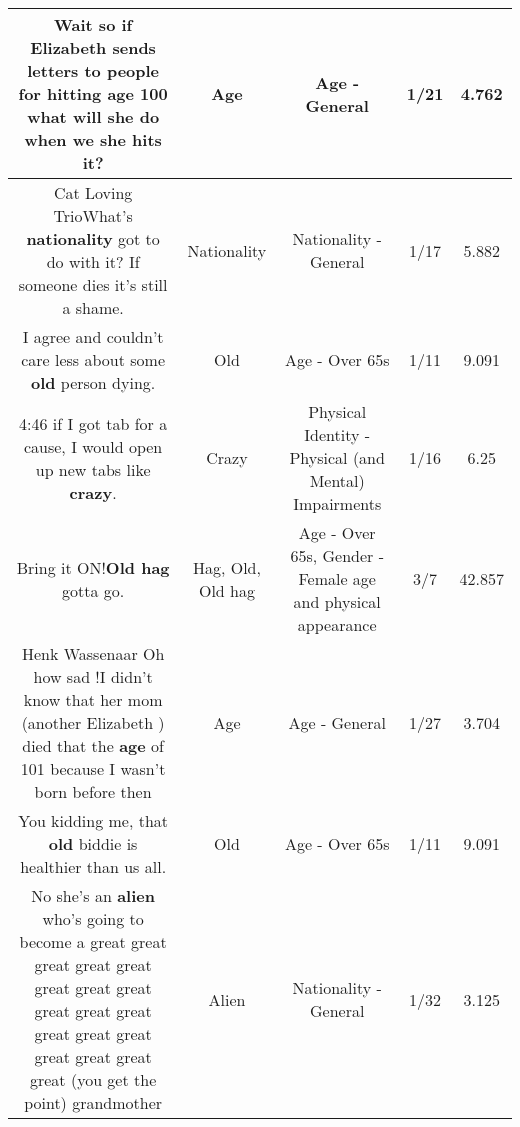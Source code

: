 \documentclass[11pt]{article}
\newlength\mylength
\begin{document}
\begin{center}
\begin{longtable}{|C{.65\mylength}|C{.30\mylength}|C{.12\mylength}|C{.12\mylength}|C{.12\mylength}|}
  \small Wait so if Elizabeth sends letters to people for hitting \textbf{age} 100 what will she do when we she hits it?\normalsize   & Age & Age - General & 1/21 & 4.762 \\  \hline
  \small Cat Loving TrioWhat's \textbf{nationality} got to do with it? If someone dies it's still a shame.\normalsize   & Nationality & Nationality - General & 1/17 & 5.882 \\  \hline
  \small I agree and couldn't care less about some \textbf{old} person dying.\normalsize   & Old & Age - Over 65s & 1/11 & 9.091 \\  \hline
  \small 4:46 if I got tab for a cause, I would open up new tabs like \textbf{crazy}.\normalsize   & Crazy & Physical Identity - Physical (and Mental) Impairments & 1/16 & 6.25 \\  \hline
  \small Bring it ON!\textbf{O\textbf{ld} h\textbf{ag}} gotta go.\normalsize   & Hag, Old, Old hag & Age - Over 65s, Gender - Female age and physical appearance & 3/7 & 42.857 \\  \hline
  \small Henk Wassenaar Oh how sad !I didn't know that her mom (another Elizabeth ) died that the \textbf{age} of 101 because I wasn't born before then\normalsize   & Age & Age - General & 1/27 & 3.704 \\  \hline
  \small You kidding me, that \textbf{old} biddie is healthier than us all.\normalsize   & Old & Age - Over 65s & 1/11 & 9.091 \\  \hline
  \small No she's an \textbf{alien} who's going to become a great great great great great great great great great great great great great great great great great great (you get the point) grandmother\normalsize   & Alien & Nationality - General & 1/32 & 3.125 \\  \hline

\end{longtable}
\end{center}
\end{document}
